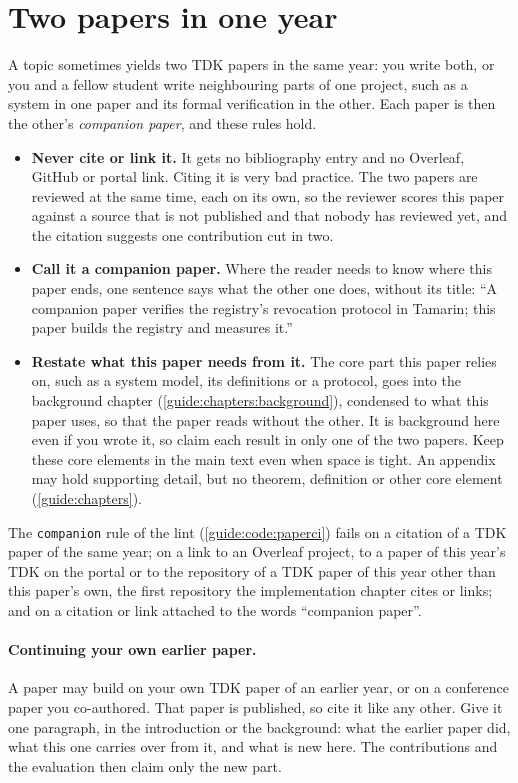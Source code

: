 \section{Two papers in one year}\label{guide:tdk:companion}
A topic sometimes yields two TDK papers in the same year: you write both, or you and a fellow student write neighbouring parts of one project, such as a system in one paper and its formal verification in the other. Each paper is then the other's \emph{companion paper}, and these rules hold.
\begin{itemize}
  \item \textbf{Never cite or link it.} It gets no bibliography entry and no Overleaf, GitHub or portal link. Citing it is very bad practice. The two papers are reviewed at the same time, each on its own, so the reviewer scores this paper against a source that is not published and that nobody has reviewed yet, and the citation suggests one contribution cut in two.
  \item \textbf{Call it a companion paper.} Where the reader needs to know where this paper ends, one sentence says what the other one does, without its title: \enquote{A companion paper verifies the registry's revocation protocol in Tamarin; this paper builds the registry and measures it.}
  \item \textbf{Restate what this paper needs from it.} The core part this paper relies on, such as a system model, its definitions or a protocol, goes into the background chapter (\cref{guide:chapters:background}), condensed to what this paper uses, so that the paper reads without the other. It is background here even if you wrote it, so claim each result in only one of the two papers. Keep these core elements in the main text even when space is tight. An appendix may hold supporting detail, but no theorem, definition or other core element (\cref{guide:chapters}).
\end{itemize}
The \texttt{companion} rule of the lint (\cref{guide:code:paperci}) fails on a citation of a TDK paper of the same year; on a link to an Overleaf project, to a paper of this year's TDK on the portal or to the repository of a TDK paper of this year other than this paper's own, the first repository the implementation chapter cites or links; and on a citation or link attached to the words \enquote{companion paper}.

\paragraph{Continuing your own earlier paper.} A paper may build on your own TDK paper of an earlier year, or on a conference paper you co-authored. That paper is published, so cite it like any other. Give it one paragraph, in the introduction or the background: what the earlier paper did, what this one carries over from it, and what is new here. The contributions and the evaluation then claim only the new part.

